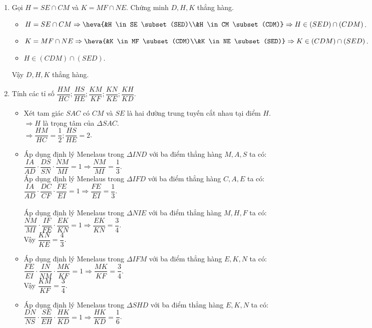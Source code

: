 \begin{bt}
{\begin{enumerate}
			
			\item Gọi $H=SE \cap CM$ và $K=MF \cap NE$. Chứng minh $D, H, K$ thẳng hàng.
			\begin{itemize}
				\item $H=SE \cap CM \Rightarrow \heva{&H \in SE \subset (SED)\\&H \in CM \subset (CDM)} \Rightarrow H \in (SED) \cap (CDM)$.
				\item $K = MF \cap NE \Rightarrow \heva{&K \in MF \subset (CDM)\\&K \in NE \subset (SED)} \Rightarrow K \in (CDM) \cap (SED)$.
				\item $H \in (CDM) \cap (SED)$.	
			\end{itemize}
			Vậy $D, H, K$ thẳng hàng.
			\item Tính các tỉ số $\dfrac{HM}{HC}; \dfrac{HS}{HE}; \dfrac{KM}{KF}; \dfrac{KN}{KE}; \dfrac{KH}{KD}$.
			\begin{itemize}
				\item Xét tam giác $SAC$ có $CM$ và $SE$ là hai đường trung tuyến cắt nhau tại điểm $H$.\\
				$ \Rightarrow H$ là trọng tâm của $\Delta SAC$.\\
				$\Rightarrow \dfrac{HM}{HC}=\dfrac{1}{2}; \dfrac{HS}{HE}=2$.
				\item Áp dụng định lý Menelaus trong $\Delta IND$ với ba điểm thẳng hàng $M, A, S$ ta có$\colon$\\$\dfrac{IA}{AD}\cdot \dfrac{DS}{SN}\cdot \dfrac{NM}{MI}=1 \Rightarrow \dfrac{NM}{MI}=\dfrac{1}{3}$.\\
				Áp dụng định lý Menelaus trong $\Delta IFD$ với ba điểm thẳng hàng $C, A, E$ ta có$\colon$\\$\dfrac{IA}{AD}\cdot \dfrac{DC}{CF}\cdot \dfrac{FE}{EI}=1 \Rightarrow \dfrac{FE}{EI}=\dfrac{1}{3}$.\\
				\\Áp dụng định lý Menelaus trong $\Delta NIE$ với ba điểm thẳng hàng $M, H, F$ ta có$\colon$\\$\dfrac{NM}{MI}\cdot \dfrac{IF}{FE}\cdot \dfrac{EK}{KN}=1 \Rightarrow \dfrac{EK}{KN}=\dfrac{3}{4}$.\\
				Vậy $\dfrac{KN}{KE}=\dfrac{4}{3}$.
				\item 
				Áp dụng định lý Menelaus trong $\Delta IFM$ với ba điểm thẳng hàng $E, K, N$ ta có$\colon$\\$\dfrac{FE}{EI}\cdot \dfrac{IN}{NM}\cdot \dfrac{MK}{KF}=1 \Rightarrow \dfrac{MK}{KF}=\dfrac{3}{4}$.\\
				Vậy $\dfrac{KM}{KF}=\dfrac{3}{4}$.
				\item Áp dụng định lý Menelaus trong $\Delta SHD$ với ba điểm thẳng hàng $E, K, N$ ta có$\colon$\\$\dfrac{DN}{NS}\cdot \dfrac{SE}{EH}\cdot \dfrac{HK}{KD}=1 \Rightarrow \dfrac{HK}{KD}=\dfrac{1}{6}$.\\
			\end{itemize}
		\end{enumerate}
		
	}
\end{bt}

